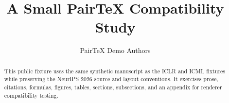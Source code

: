 \documentclass{article}
\title{A Small PairTeX Compatibility Study}
\author{PairTeX Demo Authors}
\begin{document}
\maketitle
\begin{abstract}
This public fixture uses the same synthetic manuscript as the ICLR and ICML
fixtures while preserving the NeurIPS 2026 source and layout conventions. It
exercises prose, citations, formulas, figures, tables, sections, subsections,
and an appendix for renderer compatibility testing.
\end{abstract}







\appendix

\end{document}
